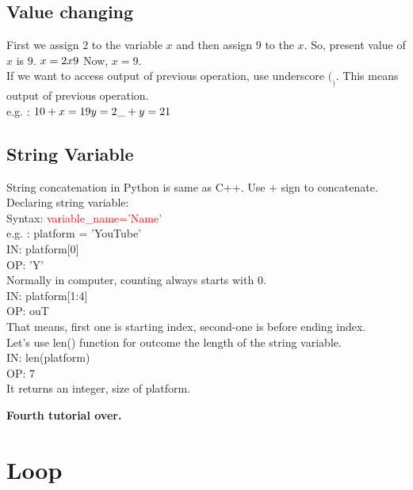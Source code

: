 \documentclass[11 pt, letterpaper]{report}
\begin{document}
\subsection{Value changing}
First we assign $2$ to the variable $x$ and then assign $9$ to the $x$. So, present value of $x$ is $9$.
$
x = 2\\
x  9\\
$
Now, $x=9$.
\\
If we want to access output of previous operation, use underscore $( _ )$. This means output of previous operation.
\\e.g. : $10 + x\\
= 19\\
y = 2\\
\_+ y\\
= 21\\
$
\subsection{String Variable}
String concatenation in Python is same as C++. Use $+$ sign to concatenate.\\
Declaring string variable:\\
Syntax: \textcolor{red}{variable\_name='Name'}\\
e.g. : platform = 'YouTube'\\
IN: platform[0]\\
OP: 'Y'\\
Normally in computer, counting always starts with 0.\\
IN: platform[1:4]\\
OP: ouT\\
That means, first one is starting index, second-one is before ending index.\\
Let's use len() function for outcome the length of the string variable.\\
IN: len(platform)\\
OP: 7\\
It returns an integer, size of platform.\\
\begin{flushright}
\textbf{Fourth tutorial over.}
\end{flushright}

\section{Loop}
\end{document}
